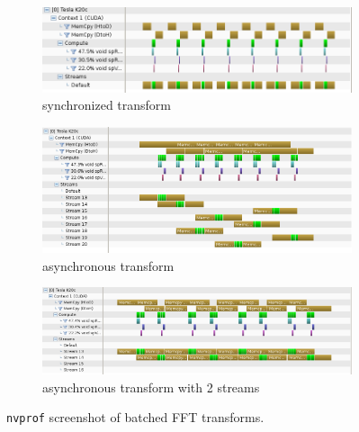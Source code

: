 \begin{figure}[h]
  \centering

  \begin{subfigure}[b]{0.9\textwidth}
    \includegraphics[width=\textwidth]{img/bench_gpu_many_nd_fft_sync_narrow}
    \caption{synchronized transform}
    \label{fig:batched_fft_sync}
  \end{subfigure}%

  \begin{subfigure}[b]{0.9\textwidth}
    \includegraphics[width=\textwidth]{img/bench_gpu_many_nd_fft_async_narrow}
    \caption{asynchronous transform}
    \label{fig:batched_fft_async}
  \end{subfigure}%

  \begin{subfigure}[b]{0.9\textwidth}
    \includegraphics[width=\textwidth]{img/bench_gpu_many_nd_fft_async2plans_narrow}
    \caption{asynchronous transform with 2 streams}
    \label{fig:batched_fft_async2plans}
  \end{subfigure}%

  \caption{\texttt{nvprof} screenshot of batched FFT transforms.}
  \label{fig:nvprof_batched_fft}
\end{figure}

